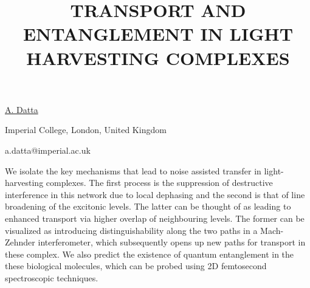\title{TRANSPORT AND ENTANGLEMENT IN LIGHT \mbox{HARVESTING} \mbox{COMPLEXES}}

\underline{A. Datta} 

{\normalsize{\vspace{-4mm}
Imperial College, London, United Kingdom

\email a.datta@imperial.ac.uk}}

We isolate the key mechanisms that lead to noise assisted transfer in
light-harvesting complexes. The first process
is the suppression of destructive interference in this network due to
local dephasing and the second is that of line
broadening of the excitonic levels. The latter can be thought of as
leading to enhanced transport via higher overlap
of neighbouring levels. The former can be visualized as introducing
distinguishability along the two paths in a
Mach-Zehnder interferometer, which subsequently opens up new paths for
transport in these complex. We also predict
the existence of quantum entanglement in the these biological molecules,
which can be probed using 2D femtosecond spectroscopic techniques.

\vspace{\baselineskip}
